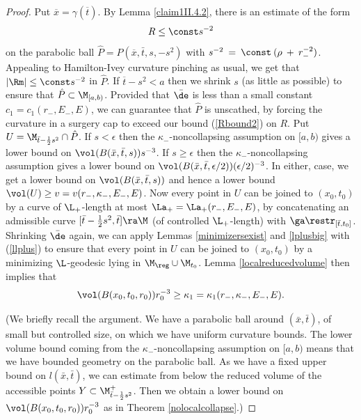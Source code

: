 \begin{proof}
Put $\overline{x} = \gamma(\overline{t})$.
By Lemma \ref{claim1II.4.2}, there is an estimate of the form
\begin{equation}
\label{Rbound2}
R\leq \const s^{-2}
\end{equation}
on the parabolic ball
$\hat P = P(\overline{x}, \bar t,s,-s^2)$ with
$s^{-2} \: = \: \const \: (\rho \: + \: r_-^{-2})$.
Appealing to Hamilton-Ivey curvature pinching as
usual, we get that $|\Rm|\leq \const s^{-2}$ in $\hat P$.
If $\overline{t} - s^2 < a$ then
we shrink $s$ (as little as possible)
to ensure that $\hat P\subset\M_{[a,b)}$.
Provided that  $\bar \de$ is less than a small constant
$c_1=c_1(r_-,E_-,E)$,
we can guarantee that $\hat P$ is unscathed, by forcing the
curvature in a surgery cap to exceed our bound (\ref{Rbound2})
on $R$.  Put
$U= \M_{\bar t-\frac12 s^2}\cap \hat P$.
If $s < \epsilon$ then
the $\kappa_-$-noncollapsing assumption on $[a,b)$  gives a lower bound
on $\vol(B(\bar x,\bar t,s))s^{-3}$. If $s \ge \epsilon$ then
the $\kappa_-$-noncollapsing assumption gives a lower bound
on $\vol(B(\bar x,\bar t,\epsilon/2)) (\epsilon/2)^{-3}$.
In either, case, we get a lower bound on $\vol(B(\bar x,\bar t,s))$ and
hence a lower bound
$\vol(U)\geq v=v(r_-,\kappa_-,E_-,E)$.
Now every point
in $U$ can be joined to $(x_0,t_0)$ by  a curve of
$\L_+$-length at most $\La_+=\La_+(r_-,E_-,E)$,
by concatenating an admissible curve
$[\bar t-\frac12 s^2,\bar t]\ra \M$ (of controlled
$\L_+$-length) with $\ga\restr_{[\bar t,t_0]}$.
Shrinking $\bar\de$ again, we can apply
Lemmas \ref{minimizersexist} and \ref{lplusbig} with
(\ref{llplus}) to ensure that every point in
$U$ can be joined to $(x_0,t_0)$ by a minimizing
$\L$-geodesic lying in $\M_{\reg}\cup \M_{t_0}$.
Lemma \ref{localreducedvolume}
then implies that
\begin{equation}
\label{kappa1}
\vol(B(x_0,t_0,r_0))r_0^{-3}\geq \kappa_1=\kappa_1(r_-,\kappa_-,E_-,E).
\end{equation}

(We briefly recall the argument. We have a parabolic ball around
$(\bar x, \bar t)$, of small but controlled size, on which we have
uniform curvature bounds.  The lower volume bound coming from
the $\kappa_-$-noncollapsing assumption
on $[a,b)$ means that we have bounded geometry on the parabolic ball.
As we have a fixed upper bound on $l(\bar x, \bar t)$, we can
estimate from below the reduced volume of the accessible points
$Y \subset \M_{\bar t-\frac12 s^2}^+$. Then we obtain a lower
bound on $\vol(B(x_0,t_0,r_0))r_0^{-3}$ as in Theorem
\ref{nolocalcollapse}.)


\end{proof}
